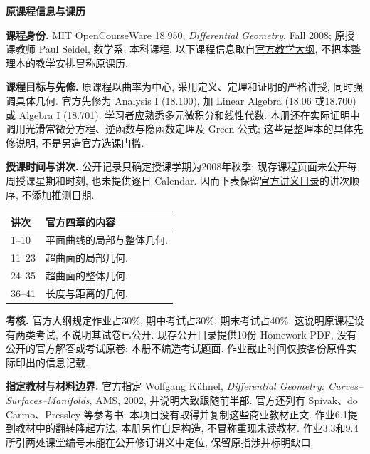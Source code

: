 \clearpage
{}
{}
\begin{center}
{\color{structurecolor}\bfseries\fontsize{14.4}{20}\selectfont 原课程信息与课历\par}
\end{center}
\noindent\textbf{课程身份.} MIT OpenCourseWare 18.950, \textit{Differential Geometry}, Fall 2008; 原授课教师 Paul Seidel, 数学系, 本科课程. 以下课程信息取自\href{https://ocw.mit.edu/courses/18-950-differential-geometry-fall-2008/pages/syllabus/}{官方教学大纲}, 不把本整理本的教学安排冒称原课历.

\noindent\textbf{课程目标与先修.} 原课程以曲率为中心, 采用定义、定理和证明的严格讲授, 同时强调具体几何. 官方先修为 Analysis I (18.100), 加 Linear Algebra (18.06 或18.700) 或 Algebra I (18.701). 学习者应熟悉多元微积分和线性代数. 本册还在实际证明中调用光滑常微分方程、逆函数与隐函数定理及 Green 公式; 这些是整理本的具体先修说明, 不是另造官方选课门槛.

\noindent\textbf{授课时间与讲次.} 公开记录只确定授课学期为2008年秋季; 现存课程页面未公开每周授课星期和时刻, 也未提供逐日 Calendar. 因而下表保留\href{https://ocw.mit.edu/courses/18-950-differential-geometry-fall-2008/pages/lecture-notes/}{官方讲义目录}的讲次顺序, 不添加推测日期.
\begin{center}
\begin{tabular}{p{}p{}}
\toprule
讲次 & 官方四章的内容\\
\midrule
1--10 & 平面曲线的局部与整体几何.\\
11--23 & 超曲面的局部几何.\\
24--35 & 超曲面的整体几何.\\
36--41 & 长度与距离的几何.\\
\bottomrule
\end{tabular}
\end{center}
\noindent\textbf{考核.} 官方大纲规定作业占30\%, 期中考试占30\%, 期末考试占40\%. 这说明原课程设有两类考试, 不说明其试卷已公开. 现存公开目录提供10份 Homework PDF, 没有公开的官方解答或考试原卷; 本册不编造考试题面. 作业截止时间仅按各份原件实际印出的信息记载.

\noindent\textbf{指定教材与材料边界.} 官方指定 Wolfgang K\"uhnel, \textit{Differential Geometry: Curves--Surfaces--Manifolds}, AMS, 2002, 并说明大致跟随前半部. 官方还列有 Spivak、do Carmo、Pressley 等参考书. 本项目没有取得并复制这些商业教材正文. 作业6.1提到教材中的翻转隆起方法, 本册另作自足构造, 不冒称重现未读教材. 作业3.3和9.4所引两处课堂编号未能在公开修订讲义中定位, 保留原指涉并标明缺口.

